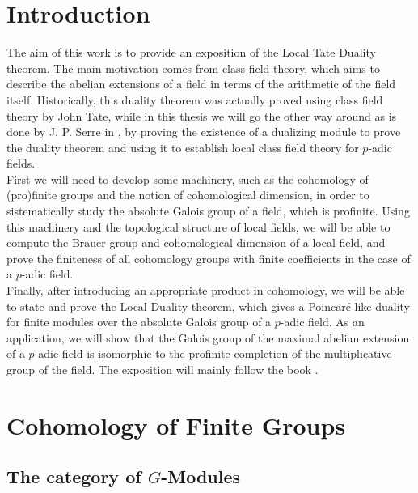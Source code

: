 \documentclass[a4paper, oneside]{memoir}
\begin{document}
\tableofcontents

\chapter*{Introduction}
The aim of this work is to provide an exposition of the Local Tate Duality theorem. The main motivation comes from class field theory, which aims to describe the abelian
extensions of a field in terms of the arithmetic of the field itself. Historically, this duality theorem was actually proved using class field theory by John Tate, while in this thesis we will go the other way around as is done by J. P. Serre in \cite{SerreCG}, by proving the existence of a dualizing module to prove the duality theorem and using it to establish local class field theory for $p$-adic fields.\\

First we will need to develop some machinery, such as the cohomology of (pro)finite groups and the notion of cohomological dimension, in order to sistematically study the absolute Galois group of
a field, which is profinite. Using this machinery and the topological structure of local fields, we will be able to compute the Brauer group and cohomological dimension of a local field, and prove the
finiteness of all cohomology groups with finite coefficients in the case of a $p$-adic field.\\

Finally, after introducing an appropriate product in cohomology, we will be able to state and prove the Local Duality theorem, which gives a Poincaré-like duality for finite modules over the
absolute Galois group of a $p$-adic field. As an application, we will show that the Galois group of the maximal abelian extension of a $p$-adic field is isomorphic to the profinite
completion of the multiplicative group of the field. The exposition will mainly follow the book \cite{Harari}.


\chapter{Cohomology of Finite Groups}

\section{\texorpdfstring{The category of $G$-Modules}{The category of G-Modules}}
\end{document}
